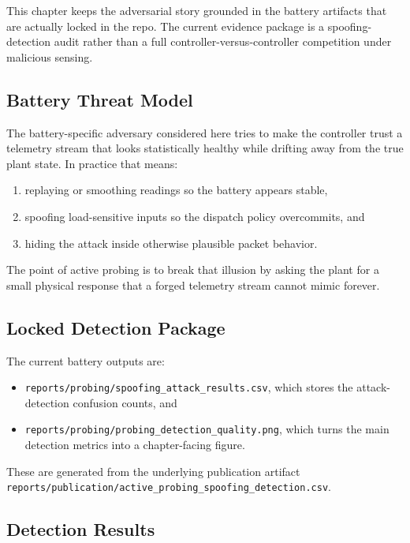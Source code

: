 This chapter keeps the adversarial story grounded in the battery artifacts
that are actually locked in the repo.  The current evidence package is a
spoofing-detection audit rather than a full controller-versus-controller
competition under malicious sensing.

\subsection{Battery Threat Model}

The battery-specific adversary considered here tries to make the controller
trust a telemetry stream that looks statistically healthy while drifting away
from the true plant state.  In practice that means:

\begin{enumerate}
  \item replaying or smoothing readings so the battery appears stable,
  \item spoofing load-sensitive inputs so the dispatch policy overcommits, and
  \item hiding the attack inside otherwise plausible packet behavior.
\end{enumerate}

The point of active probing is to break that illusion by asking the plant for
a small physical response that a forged telemetry stream cannot mimic forever.

\subsection{Locked Detection Package}

The current battery outputs are:

\begin{itemize}
  \item \texttt{reports/probing/spoofing\_attack\_results.csv}, which stores
    the attack-detection confusion counts, and
  \item \texttt{reports/probing/probing\_detection\_quality.png}, which turns
    the main detection metrics into a chapter-facing figure.
\end{itemize}

These are generated from the underlying publication artifact
\texttt{reports/publication/active\_probing\_spoofing\_detection.csv}.

\subsection{Detection Results}

